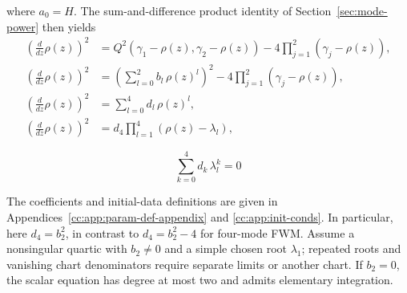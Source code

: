 \documentclass[11pt,a4paper]{article}
\numberwithin{equation}{section}
\begin{document}
where $a_0=H$. The sum-and-difference product identity of Section~\ref{sec:mode-power} then yields
\begin{align}
\left(\frac{d}{d z} \rho{\left(z \right)}\right)^{2} &= Q^{2}{\left({\gamma}_{1} - \rho{\left(z \right)}, {\gamma}_{2}  - \rho{\left(z \right)}\right)} - 4 \prod_{j=1}^{2} \left({\gamma}_{j} - \rho{\left(z \right)}\right), \label{cc:eq:drho-sqrd-1} \\
\left(\frac{d}{d z} \rho{\left(z \right)}\right)^{2} &=  \left(\sum_{l=0}^{2}b_l\,\rho\left(z\right)^l\right)^{2} - 4 \prod_{j=1}^{2} \left({\gamma}_{j} - \rho{\left(z \right)}\right), \label{cc:eq:drho-sqrd-2} \\
\left(\frac{d}{d z} \rho{\left(z \right)}\right)^{2} &= \sum_{l=0}^{4}d_l\,\rho\left(z\right)^l, \label{cc:eq:drho-sqrd-3} \\
\left(\frac{d}{d z} \rho{\left(z \right)}\right)^{2} &= d_4 \prod_{l=1}^{4} \left(\rho\left(z\right) -  \lambda_l\right), \label{cc:eq:drho-sqrd-4}
\end{align}

\begin{equation}
\sum_{k=0}^{4}d_k\,\lambda_{l}^k = 0 \label{cc:eq:lambda-root}
\end{equation}

The coefficients and initial-data definitions are given in Appendices~\ref{cc:app:param-def-appendix} and \ref{cc:app:init-conds}.
In particular, here $d_4=b_2^2$, in contrast to $d_4=b_2^2-4$ for four-mode FWM.
Assume a nonsingular quartic with $b_2\ne0$ and a simple chosen root $\lambda_1$; repeated roots and vanishing chart denominators require separate limits or another chart.
If $b_2=0$, the scalar equation has degree at most two and admits elementary integration.
\end{document}
